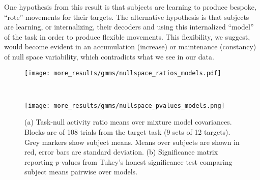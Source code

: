 \documentclass[../main.tex]{subfiles}
\begin{document}
  One hypothesis from this result is that subjects are learning to produce bespoke, ``rote'' movements for their targets. The alternative hypothesis is that subjects are learning, or internalizing, their decoders and using this internalized ``model'' of the task in order to produce flexible movements. This flexibility, we suggest, would become evident in an accumulation (increase) or maintenance (constancy) of null space variability, which contradicts what we see in our data.
  
  
    
    \begin{figure}[H]%
      \centering
      \begin{minipage}{\textwidth}
        \centering
        \texttt{[image: more\_results/gmms/nullspace\_ratios\_models.pdf]}
      \end{minipage}\\%
      \begin{minipage}{0.7\textwidth}
        \centering
        \texttt{[image: more\_results/gmms/nullspace\_pvalues\_models.png]}
      \end{minipage}%
      \caption[Task-null activity ratio over GMMs]{(a) Task-null activity ratio means over mixture model covariances. Blocks are of 108 trials from the target task (9 sets of 12 targets). Grey markers show subject means. Means over subjects are shown in red, error bars are standard deviation. (b) Significance matrix reporting $p$-values from Tukey's honest significance test comparing subject means pairwise over models.}\label{fig:gmm_task_null_ratios}
    \end{figure}
    
\end{document}
